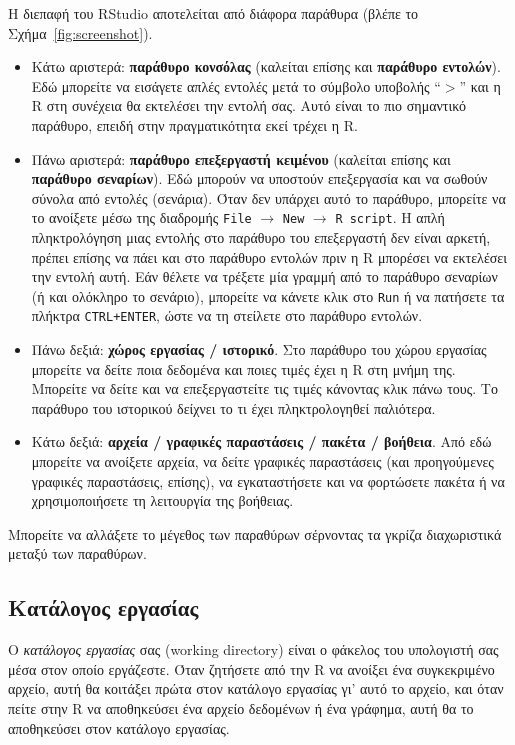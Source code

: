 \documentclass[a4paper,10pt,twocolumn]{article}
\begin{document}
Η διεπαφή του RStudio αποτελείται από διάφορα παράθυρα (βλέπε το Σχήμα~\ref{fig:screenshot}).
\begin{itemize}
\item Κάτω αριστερά: \textbf{παράθυρο κονσόλας} (καλείται επίσης και \textbf{παράθυρο εντολών}).
Εδώ μπορείτε να εισάγετε απλές εντολές μετά το σύμβολο υποβολής ``$>$'' και η R στη συνέχεια θα εκτελέσει
την εντολή σας. Αυτό είναι το πιο σημαντικό παράθυρο, επειδή στην πραγματικότητα εκεί τρέχει η R.
\item Πάνω αριστερά: \textbf{παράθυρο επεξεργαστή κειμένου} (καλείται επίσης και
\textbf{παράθυρο σεναρίων}). Εδώ μπορούν να υποστούν επεξεργασία και να σωθούν σύνολα από εντολές (σενάρια).
Όταν δεν υπάρχει αυτό το παράθυρο, μπορείτε να το ανοίξετε μέσω της διαδρομής \texttt{File} $\rightarrow$
\texttt{New} $\rightarrow$ \texttt{R script}. Η απλή πληκτρολόγηση μιας εντολής στο παράθυρο του επεξεργαστή
δεν είναι αρκετή, πρέπει επίσης να πάει και στο παράθυρο εντολών πριν η R μπορέσει να εκτελέσει την εντολή αυτή.
Εάν θέλετε να τρέξετε μία γραμμή από το παράθυρο σεναρίων (ή και ολόκληρο το σενάριο), μπορείτε να κάνετε κλικ
στο \texttt{Run} ή να πατήσετε τα πλήκτρα \texttt{CTRL+ENTER}, ώστε να τη στείλετε στο παράθυρο εντολών. 
\item Πάνω δεξιά: \textbf{χώρος εργασίας / ιστορικό}. Στο παράθυρο του χώρου εργασίας
μπορείτε να δείτε ποια δεδομένα και ποιες τιμές έχει η R στη μνήμη της. Μπορείτε να δείτε και να επεξεργαστείτε
τις τιμές κάνοντας κλικ πάνω τους. Το παράθυρο του ιστορικού δείχνει το τι έχει πληκτρολογηθεί παλιότερα. 
\item Κάτω δεξιά: \textbf{αρχεία / γραφικές παραστάσεις / πακέτα / βοήθεια}. Από εδώ μπορείτε να ανοίξετε
αρχεία, να δείτε γραφικές παραστάσεις (και προηγούμενες γραφικές παραστάσεις, επίσης), να εγκαταστήσετε
και να φορτώσετε πακέτα ή να χρησιμοποιήσετε τη λειτουργία της βοήθειας.
\end{itemize}

Μπορείτε να αλλάξετε το μέγεθος των παραθύρων σέρνοντας τα γκρίζα διαχωριστικά μεταξύ των παραθύρων.

\subsection{Κατάλογος εργασίας}

Ο \emph{κατάλογος εργασίας} σας (working directory) είναι ο φάκελος του υπολογιστή σας μέσα στον οποίο
εργάζεστε. Όταν ζητήσετε από την R να ανοίξει ένα συγκεκριμένο αρχείο, αυτή θα κοιτάξει πρώτα στον κατάλογο
εργασίας γι' αυτό το αρχείο, και όταν πείτε στην R να αποθηκεύσει ένα αρχείο δεδομένων ή ένα γράφημα, αυτή
θα το αποθηκεύσει στον κατάλογο εργασίας.
\end{document}

